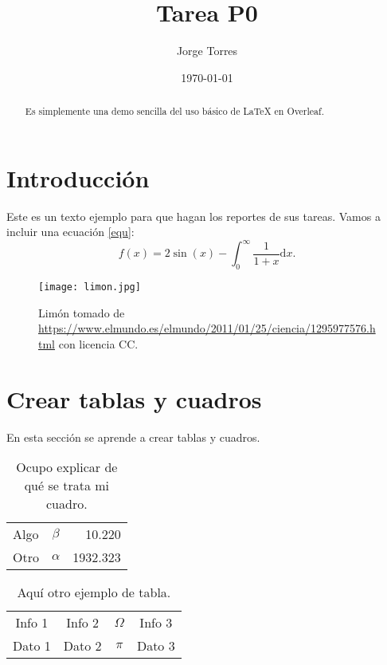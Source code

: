 \documentclass{article}
\title{Tarea P0} %
\author{Jorge Torres} %
\date{\today}
\begin{document}

\maketitle %

\begin{abstract} %
  Es simplemente una demo sencilla del uso b\'{a}sico de \LaTeX{} en
  Overleaf.
\end{abstract}

\section{Introducci\'{o}n}\label{intro} %



Este es un texto ejemplo para que hagan los reportes de sus
tareas. Vamos a incluir una ecuaci\'{o}n \eqref{equ}:
\begin{equation}
  f(x) = 2 \sin(x) - \int_0^\infty \frac{1}{1 + x} \text{d}x.
  \label{equ}
\end{equation}

\begin{figure} %
    \centering
    \texttt{[image: limon.jpg]} %
    \caption{Lim\'{o}n tomado de \url{https://www.elmundo.es/elmundo/2011/01/25/ciencia/1295977576.html} con licencia CC.}
    \label{limon}
\end{figure}

\newpage

\section{Crear tablas y cuadros}

En esta secci\'{o}n se aprende a crear tablas y cuadros.

\begin{table}[h!] %
    \caption{Ocupo explicar de qu\'{e} se trata mi cuadro.} %
    \label{datos} %
    \centering %
    \begin{tabular}{l|cr} %
         Algo & $\beta$ & 10.220 \\
         Otro & $\alpha$ & 1932.323
    \end{tabular}
\end{table}

\begin{table}[h!]
    \caption{Aqu\'{i} otro ejemplo de tabla.}
    \label{otros_datos}
    \centering
    \begin{tabular}{c|c|c|c}
      Info 1 & Info 2 & $\Omega$ & Info 3 \\
      Dato 1 & Dato 2 & $\pi$ & Dato 3
    \end{tabular}
\end{table}
\end{document}
